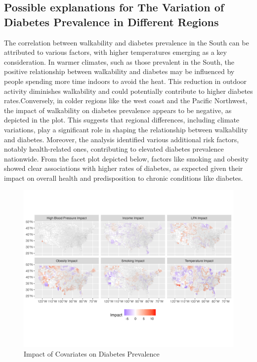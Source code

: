 \documentclass[
]{article}
\begin{document}
\subsection{Possible explanations for The Variation of Diabetes
Prevalence in Different
Regions}\label{possible-explanations-for-the-variation-of-diabetes-prevalence-in-different-regions}

The correlation between walkability and diabetes prevalence in the South
can be attributed to various factors, with higher temperatures emerging
as a key consideration. In warmer climates, such as those prevalent in
the South, the positive relationship between walkability and diabetes
may be influenced by people spending more time indoors to avoid the
heat. This reduction in outdoor activity diminishes walkability and
could potentially contribute to higher diabetes rates.Conversely, in
colder regions like the west coast and the Pacific Northwest, the impact
of walkability on diabetes prevalence appears to be negative, as
depicted in the plot. This suggests that regional differences, including
climate variations, play a significant role in shaping the relationship
between walkability and diabetes. Moreover, the analysis identified
various additional risk factors, notably health-related ones,
contributing to elevated diabetes prevalence nationwide. From the facet
plot depicted below, factors like smoking and obesity showed clear
associations with higher rates of diabetes, as expected given their
impact on overall health and predisposition to chronic conditions like
diabetes.

\begin{figure}[H]

{\centering \includegraphics{facet_plot.png}

}

\caption{Impact of Covariates on Diabetes Prevalence}

\end{figure}%
\end{document}

